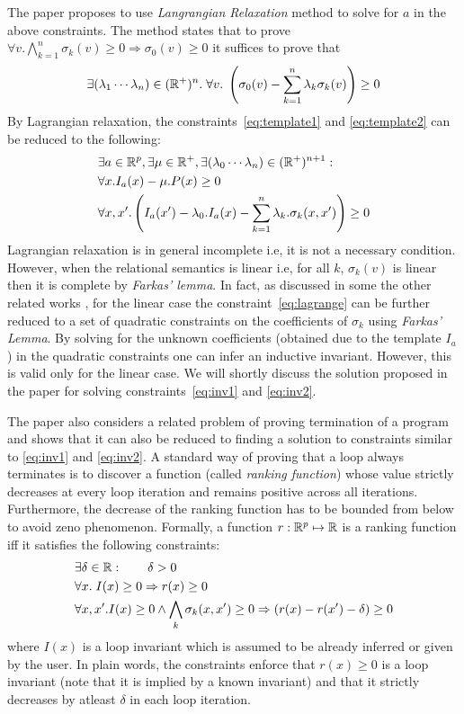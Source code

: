 The paper proposes to use \emph{Langrangian Relaxation} method to solve for $a$ in the above constraints. The method states that to prove 
$\forall v. \bigwedge \limits_{k=1}^{n} \sigma_k(v) \ge 0 \Rightarrow \sigma_0(v) \ge 0$ it suffices to prove that 
%
\begin{align}
\exists (\lambda_1 \cdots \lambda_n) \in (\real^+)^n. \; \forall v. \; \left( \sigma_0(v) -
\sum \limits_{k=1}^{n} \lambda_k \sigma_k(v) \right) \ge 0 \label{eq:lagrange}
\end{align}
%
By Lagrangian relaxation, the constraints~\ref{eq:template1} and \ref{eq:template2}
can be reduced to the following:
%
\begin{align}
& \nonumber \exists a \in \real^p, \exists \mu \in \real^+, \exists (\lambda_0 \cdots \lambda_n) \in (\real^+)^{n+1}  : \\
&\forall x. I_a(x) - \mu.P(x)  \ge 0  \label{eq:inv1}\\
&\forall x,x'. \left( I_a(x') - \lambda_0.I_a(x) - \sum \limits_{k=1}^{n} \lambda_k. \sigma_k(x,x') \right)  \ge 0 \label{eq:inv2}
\end{align}
%
Lagrangian relaxation is in general incomplete i.e, it is not a necessary condition.
However, when the relational semantics is linear i.e, for all $k$, 
$\sigma_k(v)$ is linear then it is complete by \emph{Farkas' lemma}.
In fact, as discussed in some the other related works \cite{ssriram:CAV03,ssriram:SAS04}, for the linear case the constraint~\ref{eq:lagrange} 
can be further reduced to a set of quadratic constraints on the 
coefficients of $\sigma_k$ using \emph{Farkas' Lemma}. 
By solving for the unknown coefficients (obtained due to the template $I_a$) in the
quadratic constraints one can infer an inductive invariant.
However, this is valid only for the linear case. We will shortly discuss
the solution proposed in the paper for solving constraints~\ref{eq:inv1} and \ref{eq:inv2}.

The paper also considers a related problem of proving termination of a program
and shows that it can also be reduced to finding a solution to constraints 
similar to \ref{eq:inv1} and \ref{eq:inv2}. A standard way of proving that 
a loop always terminates is to discover a function (called \emph{ranking function}) whose value strictly decreases at every loop iteration and remains positive across all iterations.
Furthermore, the decrease of the ranking function has to be bounded from below to avoid zeno phenomenon.
Formally, a function $r: \mathbb{R}^p \mapsto \mathbb{R}$ is a ranking function 
iff it satisfies the following constraints:
%
\begin{align*}
& \exists \delta \in \mathbb{R}:  \qquad \delta > 0 \\
& \forall x. \; I(x) \ge 0 \Rightarrow r(x) \ge 0 \\
& \forall x,x'. I(x) \ge 0  \wedge \bigwedge_k \sigma_k(x,x') \ge 0 \Rightarrow  
(r(x) - r(x') - \delta) \ge 0
\end{align*}
%
where $I(x)$ is a loop invariant which is assumed to be already inferred 
or given by the user. 
In plain words, the constraints enforce that $r(x) \ge 0$ is a loop invariant 
(note that it is implied by a known invariant) and that it strictly decreases by atleast $\delta$ in each loop iteration.

